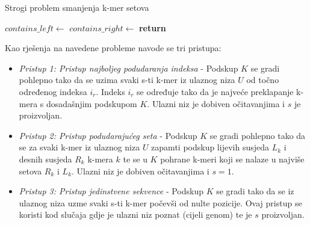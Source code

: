 \documentclass[times, utf8, seminar, numeric]{fer}
\begin{document}
\begin{algorithm}[H]
  \caption{Strogi problem smanjenja k-mer setova \cite{kbf}}
  \label{str_alg}
  \algnewcommand{}
  \begin{algorithmic}[1]
      \State $contains\_left \gets$ 
      \State $contains\_right \gets$ 
      \State \textbf{return} 
    \EndFunction\\
        \EndIf
      \EndIf
        \EndIf
      \EndFor
    \EndFunction
  \end{algorithmic}
\end{algorithm}

Kao rješenja na navedene probleme navode se tri pristupa:
\begin{itemize}
  \item{\textit{Pristup 1: Pristup najboljeg podudaranja indeksa} - Podskup {$K$}
  se gradi pohlepno tako da se uzima svaki s-ti k-mer iz ulaznog niza {$U$} od točno
  određenog indeksa {$i_r$}. Indeks {$i_r$} se određuje tako da je najveće
  preklapanje k-mera s dosadašnjim podskupom {$K$}. Ulazni niz je dobiven
  očitavanjima i {$s$} je proizvoljan.}
  \item{\textit{Pristup 2: Pristup podudarajućeg seta} - Podskup {$K$}
  se gradi pohlepno tako da se za svaki k-mer iz ulaznog niza {$U$} zapamti
  podskup lijevih susjeda {$L_k$} i desnih susjeda {$R_k$} k-mera {$k$} te se u
  {$K$} pohrane k-meri koji se nalaze u najviše setova {$R_k$} i {$L_k$}.
  Ulazni niz je dobiven očitavanjima i {$s = 1$}.}
  \item{\textit{Pristup 3: Pristup jedinstvene sekvence} - Podskup {$K$} se gradi
  tako da se iz ulaznog niza uzme svaki s-ti k-mer počevši od nulte pozicije.
  Ovaj pristup se koristi kod slučaja gdje je ulazni niz poznat (cijeli genom) te
  je {$s$} proizvoljan.}
\end{itemize}
\end{document}
